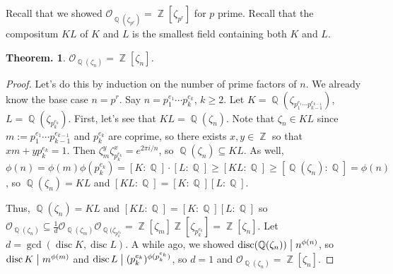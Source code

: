 \documentclass[11pt, a4paper]{memoir}
\DeclareMathOperator{\Q}{{\mathbb{Q}}}
\DeclareMathOperator{\Z}{{\mathbb{Z}}}
\renewcommand{\div}{\bigm|}
\theoremstyle{change}
\newtheorem{theorem}{Theorem.}[section]
\theoremstyle{plain}
\theoremstyle{nonumberplain}
\newtheorem{proof}{Proof}
\DeclareMathOperator{\disc}{disc}
\begin{document}
Recall that we showed $\mathcal{O}_{\Q(\zeta_{p^r})}=\Z[\zeta_{p^r}]$ for $p$ prime.
Recall that the compositum $KL$ of $K$ and $L$ is the smallest field containing both $K$ and $L$.
\begin{theorem}
    $\mathcal{O}_{\Q(\zeta_n)}=\Z[\zeta_n]$.
\end{theorem}
\begin{proof}
    Let's do this by induction on the number of prime factors of $n$.
    We already know the base case $n=p^r$.
    Say $n=p_1^{e_1}\cdots p_k^{e_k}$, $k\geq 2$.
    Let $K=\Q(\zeta_{p_1^{e_1}\cdots p_{k-1}^{e_{k-1}}})$, $L=\Q(\zeta_{p_k^{e_k}})$.
    First, let's see that $KL=\Q(\zeta_n)$.
    Note that $\zeta_n\in KL$ since $m:=p_1^{e_1}\cdots p_{k-1}^{e_{k-1}}$ and $p_k^{e_k}$ are coprime, so there exists $x,y\in\Z$ so that $xm+yp_k^{e_k}=1$.
    Then $\zeta_m^y\zeta_{p_k^{e_k}}^x=e^{2\pi i/n}$, so $\Q(\zeta_n)\subseteq KL$.
    As well, $\phi(n)=\phi(m)\phi(p_k^{e_k})=[K:\Q]\cdot[L:\Q]\geq [KL:\Q]\geq[\Q(\zeta_n):\Q]=\phi(n)$, so $\Q(\zeta_n)=KL$ and $[KL:\Q]=[K:\Q][L:\Q]$.

    Thus, $\Q(\zeta_n)=KL$ and $[KL:\Q]=[K:\Q][L:\Q]$ so $\mathcal{O}_{\Q(\zeta_n)}\subseteq\frac{1}{d}\mathcal{O}_{\Q(\zeta_m)}\mathcal{O}_{\Q(\zeta_{p_k^{e_k}}}=\Z[\zeta_m]\Z[\zeta_{p_k^{e_k}}]=\Z[\zeta_n]$.
    Let $d=\gcd(\disc K,\disc L)$.
    A while ago, we showed $\disc(\Q(\zeta_n))\div n^{\phi(n)}$, so $\disc K\div m^{\phi(m)}$ and $\disc L\div (p_k^{e_k})^{\phi(p_k^{e_k})}$, so $d=1$ and $\mathcal{O}_{\Q(\zeta_n)}=\Z[\zeta_n]$.
\end{proof}
\end{document}
